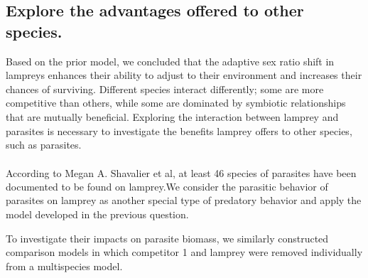\documentclass[12pt]{article}  %
\newcommand{\upcite}[1]{\textsuperscript{\textsuperscript{\cite{#1}}}}
\begin{document}
\subsection{Explore the advantages offered to other species.}
Based on the prior model, we concluded that the adaptive sex ratio shift in lampreys enhances their ability to adjust to their environment and increases their chances of surviving. Different species interact differently; some are more competitive than others, while some are dominated by symbiotic relationships that are mutually beneficial. Exploring the interaction between lamprey and parasites is necessary to investigate the benefits lamprey offers to other species, such as parasites.\par
According to Megan A. Shavalier et al\upcite{6}, at least 46 species of parasites have been documented to be found on lamprey.We consider the parasitic behavior of parasites on lamprey as another special type of predatory behavior and apply the model developed in the previous question. \par
To investigate their impacts on parasite biomass, we similarly constructed comparison models in which competitor 1 and lamprey were removed individually from a multispecies model. \par
\end{document}
